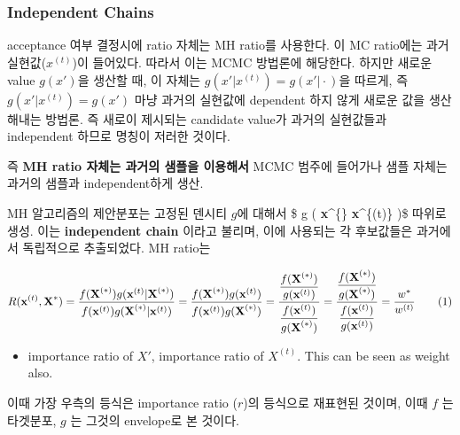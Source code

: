 \documentclass[
]{book}
\providecommand{\tightlist}{%
  \setlength{\itemsep}{0pt}\setlength{\parskip}{0pt}}
\begin{document}
~\\
~\\

\hypertarget{independent-chains}{%
\subsubsection{Independent Chains}\label{independent-chains}}

acceptance 여부 결정시에 ratio 자체는 MH ratio를 사용한다. 이 MC ratio에는 과거 실현값(\(x^{(t)}\))이 들어있다. 따라서 이는 MCMC 방법론에 해당한다. 하지만 새로운 value \(g(x')\)을 생산할 때, 이 자체는 \(g(x'\rvert x^{(t)})=g(x' \rvert \cdot )\)을 따르게, 즉 \(g(x'\rvert x^{(t)})=g(x' )\) 마냥 과거의 실현값에 dependent 하지 않게 새로운 값을 생산해내는 방법론. 즉 새로이 제시되는 candidate value가 과거의 실현값들과 independent 하므로 명칭이 저러한 것이다.

즉 \textbf{MH ratio 자체는 과거의 샘플을 이용해서} MCMC 범주에 들어가나 샘플 자체는 과거의 샘플과 independent하게 생산.

MH 알고리즘의 제안분포는 고정된 덴시티 \(g\)에 대해서 \$ g \left( \textbf {x}\^{}\{\ast\} \rvert \textbf {x}\^{}\{(t)\} \right)\$ 따위로 생성. 이는 \textbf{independent chain} 이라고 불리며, 이에 사용되는 각 후보값들은 과거에서 독립적으로 추출되었다. MH ratio는

\[
R (\textbf {x}^{(t)}, \textbf X^{\ast} ) 
= \dfrac 
{f(\textbf X^{( \ast )}) g(\textbf x^{( t )} | \textbf X^{( \ast )})} 
{f(\textbf x^{( t )}) g(\textbf X^{( \ast )} | \textbf x^{( t )}) } 
= \dfrac 
{f(\textbf X^{( \ast )}) g(\textbf x^{( t )})} 
{f(\textbf x^{( t )}) g(\textbf X^{( \ast )}) } 
=\dfrac
{\dfrac
{f(\textbf X^{( \ast )})}
{g(\textbf x^{( t )})}
}
{\dfrac
{f(\textbf x^{( t )})}
{g(\textbf X^{( \ast )})}
}
=\dfrac
{\dfrac
{f(\textbf X^{( \ast )})}
{g(\textbf X^{( \ast )})}
}
{\dfrac
{f(\textbf x^{( t )})}
{g(\textbf x^{( t )})}
}
= \dfrac {w^{\ast}} {w^{(t)}}
\tag{1}
\]

\begin{itemize}
\tightlist
\item
  importance ratio of \(X'\), importance ratio of \(X^{(t)}\). This can be seen as weight also.
\end{itemize}

이때 가장 우측의 등식은 importance ratio (\(r\))의 등식으로 재표현된 것이며, 이때 \(f\) 는 타겟분포, \(g\) 는 그것의 envelope로 본 것이다.

~\\
~\\
\end{document}
